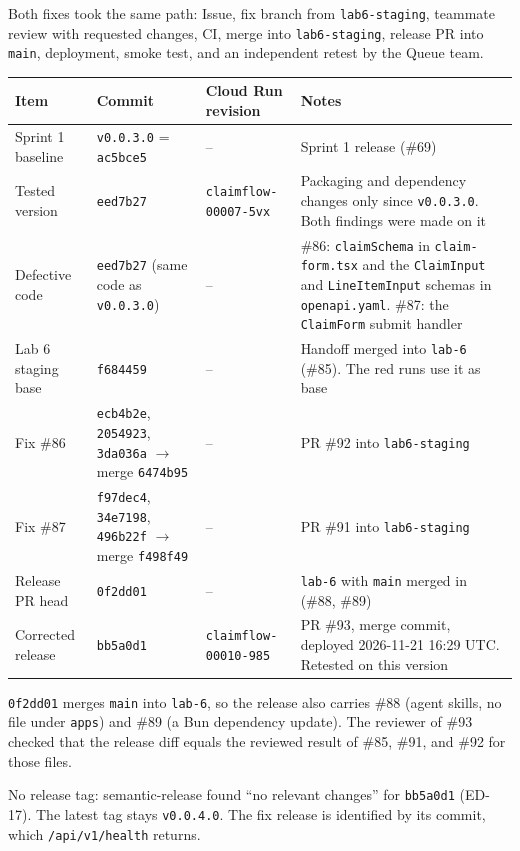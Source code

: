Both fixes took the same path: Issue, fix branch from \texttt{lab6-staging}, teammate review with requested changes, CI, merge into \texttt{lab6-staging}, release PR into \texttt{main}, deployment, smoke test, and an independent retest by the Queue team.


\begin{longtable}{@{}R{2.9cm}R{4cm}R{4.1cm}R{4.5cm}@{}}
\toprule \textbf{Item} & \textbf{Commit} & \textbf{Cloud Run revision} & \textbf{Notes} \\ \midrule \endhead
Sprint 1 baseline & \texttt{v0.0.3.0} = \texttt{ac5bce5} & – & Sprint 1 release (\#69) \\
Tested version & \texttt{eed7b27} & \texttt{claimflow-00007-5vx} & Packaging and dependency changes only since \texttt{v0.0.3.0}. Both findings were made on it \\
Defective code & \texttt{eed7b27} (same code as \texttt{v0.0.3.0}) & – & \#86: \texttt{claimSchema} in \texttt{claim-form.tsx} and the \texttt{ClaimInput} and \texttt{LineItemInput} schemas in \texttt{openapi.yaml}. \#87: the \texttt{ClaimForm} submit handler \\
Lab 6 staging base & \texttt{f684459} & – & Handoff merged into \texttt{lab-6} (\#85). The red runs use it as base \\
Fix \#86 & \texttt{ecb4b2e}, \texttt{2054923}, \texttt{3da036a} $\to$ merge \texttt{6474b95} & – & PR \#92 into \texttt{lab6-staging} \\
Fix \#87 & \texttt{f97dec4}, \texttt{34e7198}, \texttt{496b22f} $\to$ merge \texttt{f498f49} & – & PR \#91 into \texttt{lab6-staging} \\
Release PR head & \texttt{0f2dd01} & – & \texttt{lab-6} with \texttt{main} merged in (\#88, \#89) \\
Corrected release & \texttt{bb5a0d1} & \texttt{claimflow-00010-985} & PR \#93, merge commit, deployed 2026-11-21 16:29 UTC. Retested on this version \\
\bottomrule
\end{longtable}

\texttt{0f2dd01} merges \texttt{main} into \texttt{lab-6}, so the release also carries \#88 (agent skills, no file under \texttt{apps}) and \#89 (a Bun dependency update).
The reviewer of \#93 checked that the release diff equals the reviewed result of \#85, \#91, and \#92 for those files.

No release tag: semantic-release found ``no relevant changes'' for \texttt{bb5a0d1} (ED-17). The latest tag stays \texttt{v0.0.4.0}. The fix release is identified by its commit, which \texttt{/api/v1/health} returns.

